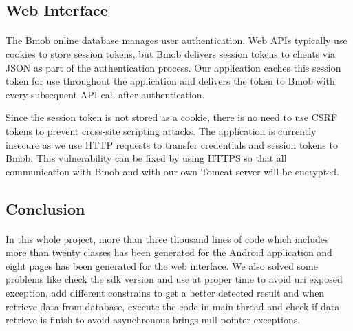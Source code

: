 \subsection{Web Interface}
\paragraph{} The Bmob online database manages user authentication.  Web APIs typically use cookies to store session tokens, but Bmob delivers session tokens to clients via JSON as part of the authentication process.  Our application caches this session token for use throughout the application and delivers the token to Bmob with every subsequent API call after authentication.  
\par Since the session token is not stored as a cookie, there is no need to use CSRF tokens to prevent cross-site scripting attacks. The application is currently insecure as we use HTTP requests to transfer credentials and session tokens to Bmob.  This vulnerability can be fixed by using HTTPS so that all communication with Bmob and with our own Tomcat server will be encrypted. 
\subsection{Conclusion}
\paragraph{} 
In this whole project, more than three thousand lines of code which includes more than twenty classes has been generated for the Android application and eight pages has been generated for the web interface. We also solved some problems like check the sdk version and use  at proper time to avoid uri exposed exception, add different constrains to get a better detected result and when retrieve data from database, execute the code in main thread and check if data retrieve is finish to avoid asynchronous brings null pointer exceptions.   
